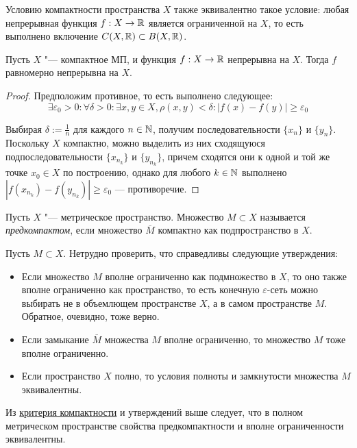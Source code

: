 \begin{note}
    Условию компактности пространства $X$ также эквивалентно такое условие: любая непрерывная функция $f : X \to \mathbb{R}$ является ограниченной на $X$, то есть выполнено включение $C(X, \mathbb{R}) \subset B(X, \mathbb{R})$.
\end{note}

\begin{theorem}[Кантора]\label{thm3.3}
    Пусть $X$ "--- компактное МП, и функция $f: X \to \mathbb{R}$ непрерывна на $X$. Тогда $f$ равномерно непрерывна на $X$.
\end{theorem}

\begin{proof}
    Предположим противное, то есть выполнено следующее:
    \[\exists \varepsilon_0 > 0: \forall \delta > 0: \exists x, y \in X, \rho(x, y) < \delta: |f(x) - f(y)| \geqslant \varepsilon_0\]

    Выбирая $\delta := \frac 1n$ для каждого $n \in \mathbb{N}$, получим последовательности $\{x_n\}$ и $\{y_n\}$. Поскольку $X$ компактно, можно выделить из них сходящуюся подпоследовательности $\{x_{n_k}\}$ и $\{y_{n_k}\}$, причем сходятся они к одной и той же точке $x_0 \in X$ по построению, однако для любого $k \in \mathbb{N}$ выполнено $|f(x_{n_k}) - f(y_{n_k})| \geqslant \varepsilon_0$ --- противоречие.
\end{proof}

\begin{definition}
    Пусть $X$ "--- метрическое пространство. Множество $M \subset X$ называется \textit{предкомпактом}, если множество $\overline M$ компактно как подпространство в $X$.
\end{definition}

\begin{note}
    Пусть $M \subset X$. Нетрудно проверить, что справедливы следующие утверждения:
    \begin{itemize}
        \item Если множество $M$ вполне ограниченно как подмножество в $X$, то оно также вполне ограниченно как пространство, то есть конечную $\varepsilon$-сеть можно выбирать не в объемлющем пространстве $X$, а в самом пространстве $M$. Обратное, очевидно, тоже верно.
        
        \item Если замыкание $\overline M$ множества $M$ вполне ограниченно, то множество $M$ тоже вполне ограниченно.
        
        \item Если пространство $X$ полно, то условия полноты и замкнутости множества $M$ эквивалентны.
    \end{itemize}

    Из \hyperref[thm3.2]{критерия компактности} и утверждений выше следует, что в полном метрическом пространстве свойства предкомпактности и вполне ограниченности эквивалентны.
\end{note}